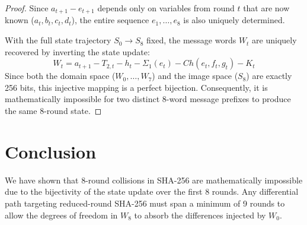 \documentclass[11pt,a4paper]{article}
\begin{document}
\begin{proof}
Since $a_{t+1} - e_{t+1}$ depends only on variables from round $t$ that are now known ($a_t, b_t, c_t, d_t$), the entire sequence $e_1, \dots, e_8$ is also uniquely determined.

With the full state trajectory $S_0 \to S_8$ fixed, the message words $W_t$ are uniquely recovered by inverting the state update:
\begin{equation}
    W_t = a_{t+1} - T_{2,t} - h_t - \Sigma_1(e_t) - Ch(e_t, f_t, g_t) - K_t
\end{equation}
Since both the domain space ($W_0, \dots, W_7$) and the image space ($S_8$) are exactly 256 bits, this injective mapping is a perfect bijection. Consequently, it is mathematically impossible for two distinct 8-word message prefixes to produce the same 8-round state.
\end{proof}

\section{Conclusion}
We have shown that 8-round collisions in SHA-256 are mathematically impossible due to the bijectivity of the state update over the first 8 rounds. Any differential path targeting reduced-round SHA-256 must span a minimum of 9 rounds to allow the degrees of freedom in $W_8$ to absorb the differences injected by $W_0$.
\end{document}
